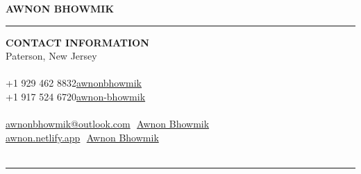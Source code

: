 \documentclass[a4paper, 12pt]{article}
\begin{document}
% 

\vspace*{-\baselineskip}

\begin{flushleft}
\large{\textbf{AWNON BHOWMIK}}
\end{flushleft}

\begin{flushleft}
\rule{\textwidth}{1pt}
\textbf{CONTACT INFORMATION}\\
\quad\faMapMarker*\quad Paterson, New Jersey\\~\\
\quad\faPhone*\quad+1 929 462 8832\qquad\qquad\qquad\qquad\faGithub\quad\href{https://github.com/awnonbhowmik}{awnonbhowmik}\\
\qquad\quad +1 917 524 6720\qquad\qquad\qquad\qquad\faLinkedin\quad\href{https://www.linkedin.com/in/awnon-bhowmik/}{awnon-bhowmik}\\~\\

\quad\faEnvelope\quad\href{mailto:awnonbhowmik@outlook.com}{awnonbhowmik@outlook.com}\qquad\,\,\,\,\aiGoogleScholarSquare\quad\href{https://scholar.google.com/citations?user=nEdZAFkAAAAJ&hl=en}{Awnon Bhowmik}\\

\quad\faGlobe\quad\href{https://awnon.netlify.app/}{awnon.netlify.app}\qquad\qquad\qquad\quad\,\,\,\,\faOrcid\quad\href{https://orcid.org/0000-0001-5858-5417}{Awnon Bhowmik}\\~\\
\rule{\textwidth}{1pt}
\end{flushleft}
\end{document}

